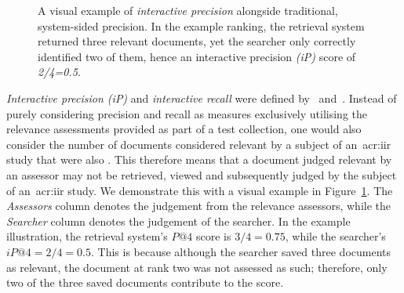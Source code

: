\begin{figure}[t!]
    \centering
    \caption[Interactive precision example]{A visual example of \emph{interactive precision} alongside traditional, system-sided precision. In the example ranking, the retrieval system returned three relevant documents, yet the searcher only correctly identified two of them, hence an interactive precision \emph{(iP)} score of \emph{2/4=0.5.}}
    \label{fig:interactive_precision}
\end{figure}

\emph{Interactive precision (iP)} and \emph{interactive recall} were defined by~\cite{veerasamy1996iir} and~\cite{veerasamy1997graphical_display}. Instead of purely considering precision and recall as measures exclusively utilising the relevance assessments provided as part of a test collection, one would also consider the number of documents considered relevant by a subject of an~\gls{acr:iir} study that were also . This therefore means that a document judged relevant by an assessor may not be retrieved, viewed and subsequently judged by the subject of an~\gls{acr:iir} study. We demonstrate this with a visual example in Figure~\ref{fig:interactive_precision}. The \emph{Assessors} column denotes the judgement from the relevance assessors, while the \emph{Searcher} column denotes the judgement of the searcher. In the example illustration, the retrieval system's $P@4$ score is $3/4=0.75$, while the searcher's $iP@4 = 2/4 = 0.5$. This is because although the searcher saved three documents as relevant, the document at rank two was not assessed as such; therefore, only two of the three saved documents contribute to the score.

